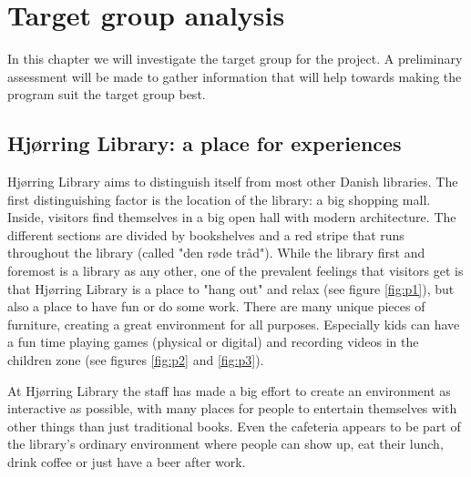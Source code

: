 \chapter{Target group analysis}
In this chapter we will investigate the target group for the project. A preliminary assessment will be made to gather information that will help towards making the program suit the target group best.

\section{Hj{\o}rring Library: a place for experiences}\label{hjoerring}


Hj{\o}rring Library aims to distinguish itself from most other Danish libraries. The first distinguishing factor is the location of the library: a big shopping mall. Inside, visitors find themselves in a big open hall with modern architecture. The different sections are divided by bookshelves and a red stripe that runs throughout the library (called "den r{\o}de tr{\aa}d"). While the library first and foremost is a library as any other, one of the prevalent feelings that visitors get is that Hj{\o}rring Library is a place to "hang out" and relax (see figure \ref{fig:p1}), but also a place to have fun or do some work. There are many unique pieces of furniture, creating a great environment for all purposes. Especially kids can have a fun time playing games (physical or digital) and recording videos in the children zone (see figures \ref{fig:p2} and \ref{fig:p3}).

At Hj{\o}rring Library the staff has made a big effort to create an environment as interactive as possible, with many places for people to entertain themselves with other things than just traditional books. Even the cafeteria appears to be part of the library's ordinary environment where people can show up, eat their lunch, drink coffee or just have a beer after work.

